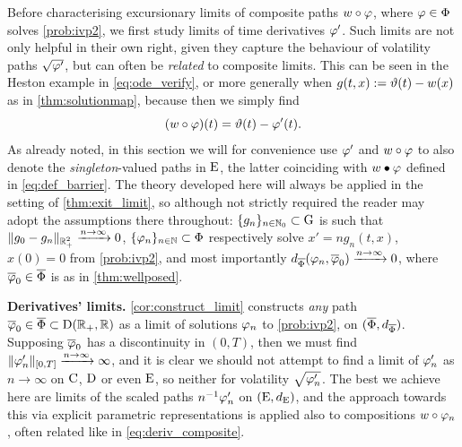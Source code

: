 \vspace{2mm} Before characterising excursionary limits of composite paths $w\circ\varphi$, where $\varphi\in\Phi$ solves \autoref{prob:ivp2}, we first study limits of time derivatives $\varphi'$. Such limits are not only helpful in their own right, given they capture the behaviour of volatility paths $\sqrt{\varphi'}$, but can often be \emph{related} to composite limits. This can be seen in the Heston example in \autoref{eq:ode_verify}, or more generally when $g(t,x):=\vartheta(t)-w(x)$ as in \autoref{thm:solutionmap}, because then we simply find
\begin{equation}\label{eq:deriv_composite}
    (w\circ\varphi)(t) = \vartheta(t) - \varphi'(t).
\end{equation}
As already noted, in this section we will for convenience use $\varphi'$ and $w\circ\varphi$ to also denote the \emph{singleton}-valued paths in $\mathrm{E}$, the latter coinciding with $w\bullet\varphi$ defined in \autoref{eq:def_barrier}. The theory developed here will always be applied in the setting of \autoref{thm:exit_limit}, so although not strictly required the reader may adopt the assumptions there throughout: $\{g_n\}_{n\in\mathbb{N}_0}\subset\mathrm{G}$ is such that $\Vert g_0 - g_n \Vert_{\mathbb{R}_+^2}\xrightarrow{n\to\infty}0$, $\{\varphi_n\}_{n\in\mathbb{N}}\subset\Phi$ respectively solve $x'=ng_n(t,x)$, $x(0)=0$ from \autoref{prob:ivp2}, and most importantly $d_{\overline{\Phi}}(\varphi_n,\overline{\varphi}_0)\xrightarrow{n\to\infty}0$, where $\overline{\varphi}_0\in\overline{\Phi}$ is as in \autoref{thm:wellposed}.

\vspace{3mm}\textbf{Derivatives' limits.} \autoref{cor:construct_limit} constructs \emph{any} path $\overline{\varphi}_0\in\overline{\Phi}\subset\mathrm{D}(\mathbb{R}_+,\mathbb{R})$ as a limit of solutions $\varphi_n$ to \autoref{prob:ivp2}, on $(\overline{\Phi},d_{\overline{\Phi}})$. Supposing $\overline{\varphi}_0$ has a discontinuity in $(0,T)$, then we must find $\Vert \varphi'_n \Vert_{[0,T]}\xrightarrow{n\to\infty}\infty$, and it is clear we should not attempt to find a limit of $\varphi'_n$ as $n\to\infty$ on $\mathrm{C}$, $\mathrm{D}$ or even $\mathrm{E}$, so neither for volatility $\sqrt{\varphi'_n}$. The best we achieve here are limits of the scaled paths $n^{-1}\varphi'_n$ on $(\mathrm{E},d_{\mathrm{E}})$, and the approach towards this via explicit parametric representations is applied also to compositions $w\circ\varphi_n$, often related like in \autoref{eq:deriv_composite}.

